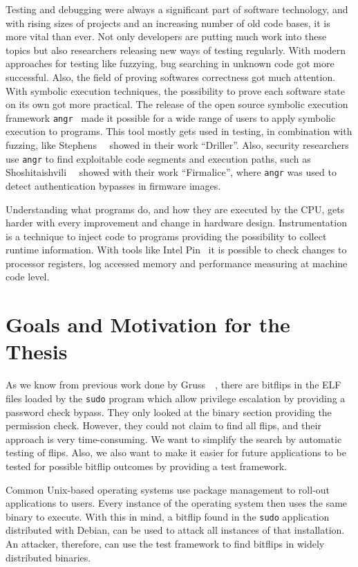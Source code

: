 Testing and debugging were always a significant part of software technology, and
with rising sizes of projects and an increasing number of old code bases, it is
more vital than ever. Not only developers are putting much work into these
topics but also researchers releasing new ways of testing regularly. With modern
approaches for testing like fuzzying, bug searching in unknown code got more
successful. Also, the field of proving software\textquotesingle s correctness
got much attention. With symbolic execution techniques, the possibility to prove
each software state on its own got more practical. The release of the open
source symbolic execution framework \texttt{angr}~\cite{angrpaper} made it
possible for a wide range of users to apply symbolic execution to programs. This
tool mostly gets used in testing, in combination with fuzzing, like
Stephens~\etal~\cite{driller} showed in their work ``Driller''. Also, security
researchers use \texttt{angr} to find exploitable code segments and execution
paths, such as Shoshitaishvili~\etal~\cite{boomerang} showed with their work
``Firmalice'', where \texttt{angr} was used to detect authentication bypasses in
firmware images.

Understanding what programs do, and how they are executed by the CPU, gets
harder with every improvement and change in hardware design. Instrumentation is
a technique to inject code to programs providing the possibility to collect
runtime information. With tools like Intel Pin~\cite{pintool} it is possible to
check changes to processor registers, log accessed memory and performance
measuring at machine code level.

\section{Goals and Motivation for the Thesis}

As we know from previous work done by Gruss~\etal~\cite{flipinthewall}, there
are bitflips in the ELF files loaded by the \texttt{sudo} program which allow
privilege escalation by providing a password check bypass. They only looked at
the binary section providing the permission check. However, they could not claim
to find all flips, and their approach is very time-consuming. We want to
simplify the search by automatic testing of flips. Also, we also want to make it
easier for future applications to be tested for possible bitflip outcomes by
providing a test framework.

Common Unix-based operating systems use package management to roll-out
applications to users. Every instance of the operating system then uses the same
binary to execute. With this in mind, a bitflip found in the \texttt{sudo}
application distributed with Debian, can be used to attack all instances of that
installation. An attacker, therefore, can use the test framework to find
bitflips in widely distributed binaries.

